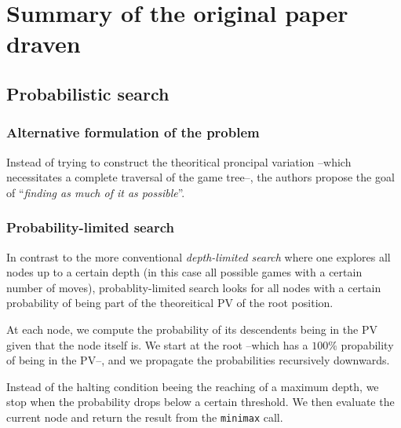 
\chapter{Summary of the original paper draven}
    \section{Probabilistic search}
        \subsection{Alternative formulation of the problem}
        
            Instead of trying to construct the theoritical proncipal variation --which necessitates a complete traversal of the game tree--, the authors propose the goal of ``\emph{finding as much of it as possible}''.

        \subsection{Probability-limited search}

            In contrast to the more conventional \emph{depth-limited search} where one explores all nodes up to a certain depth (in this case all possible games with a certain number of moves), probablity-limited search looks for all nodes with a certain probability of being part of the theoreitical PV of the root position.
            
            At each node, we compute the probability of its descendents being in the PV given that the node itself is. We start at the root --which has a \(100\%\) propability of being in the PV--, and we propagate the probabilities recursively downwards.
            
            Instead of the halting condition beeing the reaching of a maximum depth, we stop when the probability drops below a certain threshold. We then evaluate the current node and return the result from the \verb|minimax| call.